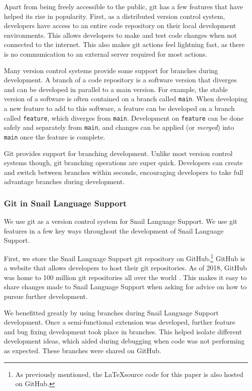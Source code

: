\documentclass{article}
\begin{document}
Apart from being freely accessible to the public, git has a few features that have helped its rise in popularity. First, as a distributed version control system, developers have access to an entire code repository on their local development environments. This allows developers to make and test code changes when not connected to the internet. This also makes git actions feel lightning fast, as there is no communication to an external server required for most actions. 

Many version control systems provide some support for branches during development. A branch of a code repository is a software version that diverges and can be developed in parallel to a main version. For example, the stable version of a software is often contained on a branch called \lstinline{main}. When developing a new feature to add to this software, a feature can be developed on a branch called \lstinline{feature}, which diverges from \lstinline{main}. Development on \lstinline{feature} can be done safely and separately from \lstinline{main}, and changes can be applied (or \emph{merged}) into \lstinline{main} once the feature is complete.

Git provides support for branching development. Unlike most version control systems though, git branching operations are super quick. Developers can create and switch between branches within seconds, encouraging developers to take full advantage branches during development. 

\subsubsection{Git in Snail Language Support}

We use git as a version control system for Snail Language Support. We use git features in a few key ways throughout the development of Snail Language Support.

First, we store the Snail Language Support git repository on GitHub.\footnote{As previously mentioned, the \LaTeX source code for this paper is also hosted on GitHub.} GitHub is a website that allows developers to host their git repositories. As of 2018, GitHub was home to 100 million git repositories all over the world \cite{Warner_2018}. This makes it easy to share changes made to Snail Language Support when asking for advice on how to pursue further development.

We benefitted greatly by using branches during Snail Language Support development. Once a semi-functional extension was developed, further feature and bug fixing development took place in branches. This helped isolate different development ideas, which aided during debugging when code was not performing as expected. These branches were shared on GitHub.
\end{document}
